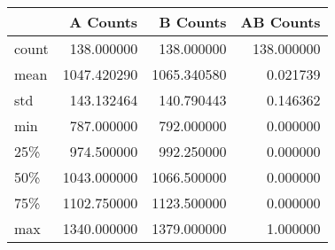 \begin{tabular}{lrrr}
\toprule
{} &     A Counts &     B Counts &   AB Counts \\
\midrule
count &   138.000000 &   138.000000 &  138.000000 \\
mean  &  1047.420290 &  1065.340580 &    0.021739 \\
std   &   143.132464 &   140.790443 &    0.146362 \\
min   &   787.000000 &   792.000000 &    0.000000 \\
25\%   &   974.500000 &   992.250000 &    0.000000 \\
50\%   &  1043.000000 &  1066.500000 &    0.000000 \\
75\%   &  1102.750000 &  1123.500000 &    0.000000 \\
max   &  1340.000000 &  1379.000000 &    1.000000 \\
\bottomrule
\end{tabular}
